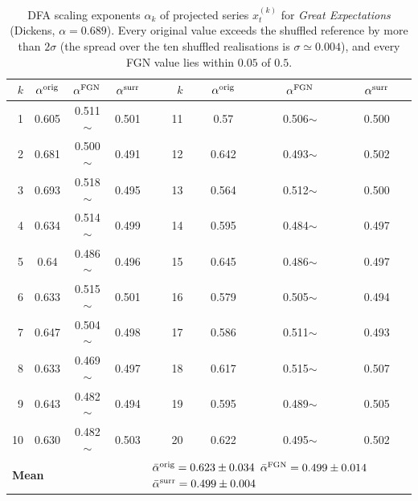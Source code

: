 \documentclass[preprint]{elsarticle}
\begin{document}
\begin{table}[H]
\centering
\caption{DFA scaling exponents $\alpha_k$ of projected series
$x_t^{(k)}$ for \emph{Great Expectations} (Dickens, $\alpha=0.689$).
Every original value exceeds the shuffled reference by more than
$2\sigma$ (the spread over the ten shuffled realisations is
$\sigma\simeq0.004$), and every FGN value lies within $0.05$ of $0.5$.}
\label{tab:dfa_proj}
\scriptsize
\setlength{\tabcolsep}{4pt}
\begin{tabular}{r ccc r ccc}
\toprule
$k$ & $\alpha^{\rm orig}$ & $\alpha^{\rm FGN}$ &
    $\alpha^{\rm surr}$ &
$k$ & $\alpha^{\rm orig}$ & $\alpha^{\rm FGN}$ &
    $\alpha^{\rm surr}$ \\
\midrule
 1 & 0.605 & 0.511$\sim$ & 0.501 &
11 & 0.57 & 0.506$\sim$ & 0.500 \\
 2 & 0.681 & 0.500$\sim$ & 0.491 &
12 & 0.642 & 0.493$\sim$ & 0.502 \\
 3 & 0.693 & 0.518$\sim$ & 0.495 &
13 & 0.564 & 0.512$\sim$ & 0.500 \\
 4 & 0.634 & 0.514$\sim$ & 0.499 &
14 & 0.595 & 0.484$\sim$ & 0.497 \\
 5 & 0.64 & 0.486$\sim$ & 0.496 &
15 & 0.645 & 0.486$\sim$ & 0.497 \\
 6 & 0.633 & 0.515$\sim$ & 0.501 &
16 & 0.579 & 0.505$\sim$ & 0.494 \\
 7 & 0.647 & 0.504$\sim$ & 0.498 &
17 & 0.586 & 0.511$\sim$ & 0.493 \\
 8 & 0.633 & 0.469$\sim$ & 0.497 &
18 & 0.617 & 0.515$\sim$ & 0.507 \\
 9 & 0.643 & 0.482$\sim$ & 0.494 &
19 & 0.595 & 0.489$\sim$ & 0.505 \\
10 & 0.630 & 0.482$\sim$ & 0.503 &
20 & 0.622 & 0.495$\sim$ & 0.502 \\
\midrule
\multicolumn{4}{l}{\textbf{Mean}} &
\multicolumn{4}{l}{$\bar\alpha^{\rm orig}=0.623\pm0.034$ \quad
                   $\bar\alpha^{\rm FGN}=0.499\pm0.014$ \quad
                   $\bar\alpha^{\rm surr}=0.499\pm0.004$}\\
\bottomrule
\end{tabular}
\end{table}
\end{document}
